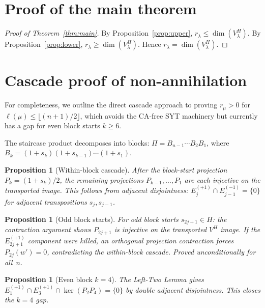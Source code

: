 \documentclass[11pt]{article}
\newtheorem{proposition}[theorem]{Proposition}
\theoremstyle{definition}
\theoremstyle{remark}
\begin{document}
\section{Proof of the main theorem}

\begin{proof}[Proof of Theorem~\ref{thm:main}]
By Proposition~\ref{prop:upper}, $r_\lambda \le \dim(V_\lambda^H)$.
By Proposition~\ref{prop:lower}, $r_\lambda \ge \dim(V_\lambda^H)$.
Hence $r_\lambda = \dim(V_\lambda^H)$.
\end{proof}

\section{Cascade proof of non-annihilation}\label{sec:cascade}

For completeness, we outline the direct cascade approach to proving
$r_\mu > 0$ for $\ell(\mu) \le \lfloor(n+1)/2\rfloor$, which avoids
the CA-free SYT machinery but currently has a gap for even block
starts $k \ge 6$.

The staircase product decomposes into blocks:
$\Pi = B_{n-1} \cdots B_2 B_1$, where
$B_k = (1+s_k)(1+s_{k-1})\cdots(1+s_1)$.

\begin{proposition}[Within-block cascade]
After the block-start projection $P_k = (1+s_k)/2$, the remaining
projections $P_{k-1},\ldots,P_1$ are each injective on the transported
image. This follows from adjacent disjointness:
$E_j^{(+1)} \cap E_{j-1}^{(-1)} = \{0\}$ for adjacent transpositions
$s_j, s_{j-1}$.
\end{proposition}

\begin{proposition}[Odd block starts]
For odd block starts $s_{2j+1} \in H$: the contraction argument
shows $P_{2j+1}$ is injective on the transported $V^H$ image.
If the $E_{2j+1}^{(+1)}$ component were killed, an orthogonal
projection contraction forces $P_{2j}(w') = 0$, contradicting
the within-block cascade. Proved unconditionally for all~$n$.
\end{proposition}

\begin{proposition}[Even block $k=4$]
The Left-Two Lemma gives
$E_1^{(+1)} \cap E_3^{(+1)} \cap \ker(P_2 P_4) = \{0\}$
by double adjacent disjointness. This closes the $k=4$ gap.
\end{proposition}
\end{document}
